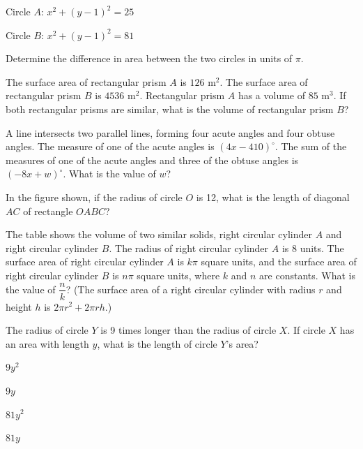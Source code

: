 \vfill
\noindent\begin{minipage}{\linewidth}
\par\smallskip
Circle $A$: $x^2+(y-1)^2=25$\par Circle $B$: $x^2+(y-1)^2=81$\par\smallskip Determine the difference in area between the two circles in units of $\pi$.
\end{minipage}
\vfill
\noindent\begin{minipage}{\linewidth}
\par\smallskip
The surface area of rectangular prism $A$ is $126$ m$^2$. The surface area of rectangular prism $B$ is $4536$ m$^2$. Rectangular prism $A$ has a volume of $85$ m$^3$. If both rectangular prisms are similar, what is the volume of rectangular prism $B$?
\end{minipage}
\vfill
\clearpage
\noindent\begin{minipage}{\linewidth}
\par\smallskip
A line intersects two parallel lines, forming four acute angles and four obtuse angles. The measure of one of the acute angles is $(4x-410)^\circ$. The sum of the measures of one of the acute angles and three of the obtuse angles is $(-8x+w)^\circ$. What is the value of $w$?
\end{minipage}
\vfill
\noindent\begin{minipage}{\linewidth}
\par\smallskip
In the figure shown, if the radius of circle $O$ is 12, what is the length of diagonal $AC$ of rectangle $OABC$?
\satfig{\figcircleoabc}
\end{minipage}
\vfill
\noindent\begin{minipage}{\linewidth}
\par\smallskip
The table shows the volume of two similar solids, right circular cylinder $A$ and right circular cylinder $B$. The radius of right circular cylinder $A$ is 8 units. The surface area of right circular cylinder $A$ is $k\pi$ square units, and the surface area of right circular cylinder $B$ is $n\pi$ square units, where $k$ and $n$ are constants. What is the value of $\dfrac{n}{k}$? (The surface area of a right circular cylinder with radius $r$ and height $h$ is $2\pi r^2+2\pi rh$.)
\satfig{\figtblcylab}
\end{minipage}
\vfill
\clearpage
\noindent\begin{minipage}{\linewidth}
\par\smallskip
The radius of circle $Y$ is 9 times longer than the radius of circle $X$. If circle $X$ has an area with length $y$, what is the length of circle $Y$'s area?
\begin{satchoices}
  \item[A)] $9y^2$
  \item[B)] $9y$
  \item[C)] $81y^2$
  \item[D)] $81y$
\end{satchoices}
\end{minipage}
